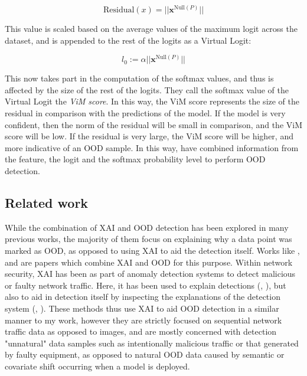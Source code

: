 \documentclass[UKenglish]{uiomasterthesis} %
\theoremstyle{definition}
\begin{document}
\begin{equation}
\text{Residual}(x) = || \bm{x}^{\text{Null}(P)}||
\label{virtuallogit}
\end{equation}

This value is scaled based on the average values of the maximum logit across the dataset, and is appended to the rest of the logits as a Virtual Logit:

\begin{equation}
l_0 := \alpha || \bm{x}^{\text{Null}(P)}||
\label{virtuallogit}
\end{equation}

This now takes part in the computation of the softmax values, and thus is affected by the size of the rest of the logits. They call the softmax value of the Virtual Logit the {\it ViM score}. In this way, the ViM score represents the size of the residual in comparison with the predictions of the model. If the model is very confident, then the norm of the residual will be small in comparison, and the ViM score will be low. If the residual is very large, the ViM score will be higher, and more indicative of an OOD sample. In this way, \cite{vim} have combined information from the feature, the logit and the softmax probability level to perform OOD detection.

\subsection{Related work}

While the combination of XAI and OOD detection has been explored in many previous works, the majority of them focus on explaining why a data point was marked as OOD, as opposed to using XAI to aid the detection itself. Works like \cite{uncertainty}, \cite{generalxaiforood} and \cite{tallon2020explainable} are papers which combine XAI and OOD for this purpose. Within network security, XAI has been as part of anomaly detection systems to detect malicious or faulty network traffic. Here, it has been used to explain detections (\cite{idsxai}, \cite{mahbooba}), but also to aid in detection itself by inspecting the explanations of the detection system (\cite{tcydenova2021detection}, \cite{dnsxai}). These methods thus use XAI to aid OOD detection in a similar manner to my work, however they are strictly focused on sequential network traffic data as opposed to images, and are mostly concerned with detection "unnatural" data samples such as intentionally malicious traffic or that generated by faulty equipment, as opposed to natural OOD data caused by semantic or covariate shift occurring when a model is deployed.
\end{document}
